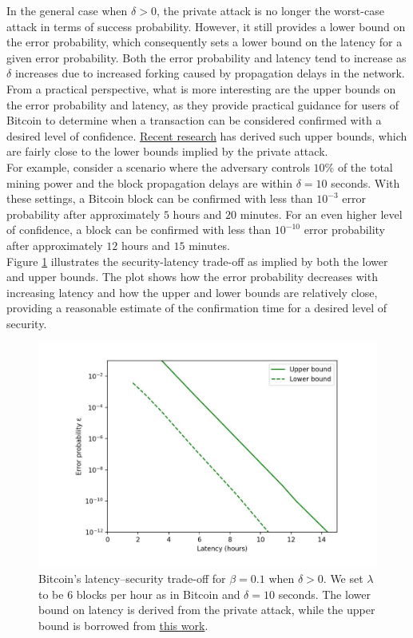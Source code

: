 \documentclass{report}
\begin{document}
In the general case when $\delta > 0$, the private attack is no longer the worst-case attack in terms of success probability. However, it still provides a lower bound on the error probability, which consequently sets a lower bound on the latency for a given error probability. Both the error probability and latency tend to increase as $\delta$ increases due to increased forking caused by propagation delays in the network.\\
From a practical perspective, what is more interesting are the upper bounds on the error probability and latency, as they provide practical guidance for users of Bitcoin to determine when a transaction can be considered confirmed with a desired level of confidence. \href{https://arxiv.org/pdf/2011.14051.pdf}{Recent research} has derived such upper bounds, which are fairly close to the lower bounds implied by the private attack.\\
For example, consider a scenario where the adversary controls $10\%$ of the total mining power and the block propagation delays are within $\delta = 10$ seconds. With these settings, a Bitcoin block can be confirmed with less than $10^{-3}$ error probability after approximately $5$ hours and $20$ minutes. For an even higher level of confidence, a block can be confirmed with less than $10^{-10}$ error probability after approximately $12$ hours and $15$ minutes.\\
Figure \ref{fig:f2} illustrates the security-latency trade-off as implied by both the lower and upper bounds. The plot shows how the error probability decreases with increasing latency and how the upper and lower bounds are relatively close, providing a reasonable estimate of the confirmation time for a desired level of security.
\begin{center}
	\begin{figure}
		\centering
		\includegraphics[width=0.8\linewidth]{Fig/F2}
		\caption{Bitcoin’s latency–security trade-oﬀ for $\beta = 0.1$ when $\delta > 0$. We set $\lambda$ to be $6$ blocks per hour as in Bitcoin and $\delta = 10$ seconds. The lower bound on latency is derived from the private attack, while the upper bound is borrowed from \href{https://arxiv.org/pdf/2011.14051.pdf}{this work}.}
		\label{fig:f2}
	\end{figure}
\end{center}
\end{document}
